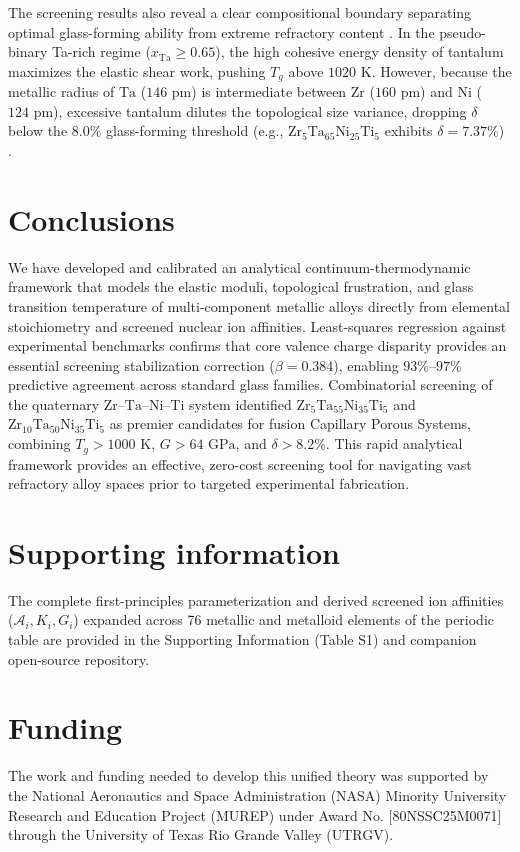 \documentclass[aps,prmaterials,reprint,superscriptaddress,amsmath,amssymb,floatfix]{revtex4-2}
\begin{document}
The screening results also reveal a clear compositional boundary separating optimal glass-forming ability from extreme refractory content \cite{CPS_Review_2020}. In the pseudo-binary Ta-rich regime ($x_{\text{Ta}} \ge 0.65$), the high cohesive energy density of tantalum maximizes the elastic shear work, pushing $T_g$ above $1020\text{ K}$. However, because the metallic radius of $\text{Ta}$ ($146\text{ pm}$) is intermediate between $\text{Zr}$ ($160\text{ pm}$) and $\text{Ni}$ ($124\text{ pm}$), excessive tantalum dilutes the topological size variance, dropping $\delta$ below the $8.0\%$ glass-forming threshold (e.g., $\text{Zr}_5\text{Ta}_{65}\text{Ni}_{25}\text{Ti}_5$ exhibits $\delta = 7.37\%$) \cite{Egami1984,Inoue2000Acta}.

\section{Conclusions}
We have developed and calibrated an analytical continuum-thermodynamic framework that models the elastic moduli, topological frustration, and glass transition temperature of multi-component metallic alloys directly from elemental stoichiometry and screened nuclear ion affinities. Least-squares regression against experimental benchmarks confirms that core valence charge disparity provides an essential screening stabilization correction ($\beta = 0.384$), enabling $93\%$--$97\%$ predictive agreement across standard glass families. Combinatorial screening of the quaternary $\text{Zr--Ta--Ni--Ti}$ system identified $\text{Zr}_5\text{Ta}_{55}\text{Ni}_{35}\text{Ti}_5$ and $\text{Zr}_{10}\text{Ta}_{50}\text{Ni}_{35}\text{Ti}_5$ as premier candidates for fusion Capillary Porous Systems, combining $T_g > 1000\text{ K}$, $G > 64\text{ GPa}$, and $\delta > 8.2\%$. This rapid analytical framework provides an effective, zero-cost screening tool for navigating vast refractory alloy spaces prior to targeted experimental fabrication.

\section{Supporting information}
The complete first-principles parameterization and derived screened ion affinities ($\mathcal{A}_i, K_i, G_i$) expanded across 76 metallic and metalloid elements of the periodic table are provided in the Supporting Information (Table S1) and companion open-source repository.

\section{Funding}
The work and funding needed to develop this unified theory was supported by the National Aeronautics and Space Administration (NASA) Minority University Research and Education Project (MUREP) under Award No. [80NSSC25M0071] through the University of Texas Rio Grande Valley (UTRGV). 
\end{document}
